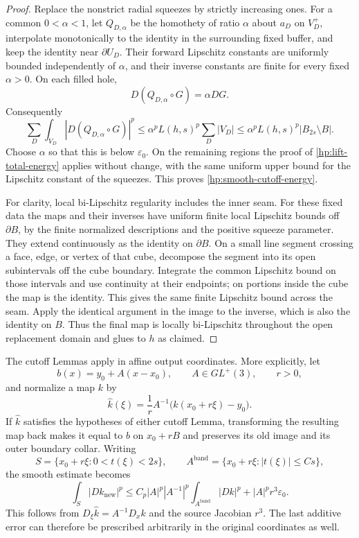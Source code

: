 \begin{proof}
Replace the nonstrict radial squeezes by strictly increasing ones.
For a common $0<\alpha<1$, let $Q_{D,\alpha}$ be the homothety of
ratio $\alpha$ about $a_D$ on $V_D^+$, interpolate monotonically to
the identity in the surrounding fixed buffer, and keep the identity
near $\partial U_D$.  Their forward Lipschitz constants are uniformly
bounded independently of $\alpha$, and their inverse constants are
finite for every fixed $\alpha>0$.  On each filled hole,
\[
 D(Q_{D,\alpha}\circ G)=\alpha DG.
\]
Consequently
\[
 \sum_D\int_{V_D}|D(Q_{D,\alpha}\circ G)|^p
 \leq\alpha^pL(h,s)^p\sum_D|V_D|
 \leq\alpha^pL(h,s)^p|B_{2s}\setminus B|.
\]
Choose $\alpha$ so that this is below $\varepsilon_0$.  On the
remaining regions the proof of
\eqref{hp:lift-total-energy} applies without change, with the same
uniform upper bound for the Lipschitz constant of the squeezes.
This proves \eqref{hp:smooth-cutoff-energy}.

For clarity, local bi-Lipschitz regularity includes the inner seam.
For these fixed data the maps and their inverses have uniform finite
local Lipschitz bounds off $\partial B$, by the finite normalized
descriptions and the positive squeeze parameter.  They extend
continuously as the identity on $\partial B$.  On a small line
segment crossing a face, edge, or vertex of that cube, decompose the
segment into its open subintervals off the cube boundary.  Integrate
the common Lipschitz bound on those intervals and use continuity at
their endpoints; on portions inside the cube the map is the identity.
This gives the same finite Lipschitz bound across the seam.  Apply
the identical argument in the image to the inverse, which is also
the identity on $B$.  Thus the final map is locally bi-Lipschitz
throughout the open replacement domain and glues to $h$ as claimed.
\end{proof}

\begin{remark}\label{hp:cutoff-affine-scaling}
The cutoff Lemmas apply in affine output coordinates.  More
explicitly, let
\[
 b(x)=y_0+A(x-x_0),\qquad A\in GL^+(3),\qquad r>0,
\]
and normalize a map $k$ by
\[
 \widehat k(\xi)
 =\frac1r A^{-1}\bigl(k(x_0+r\xi)-y_0\bigr).
\]
If $\widehat k$ satisfies the hypotheses of either cutoff Lemma,
transforming the resulting map back makes it equal to $b$ on
$x_0+rB$ and preserves its old image and its outer boundary collar.
Writing
\[
 S=\{x_0+r\xi:0<t(\xi)<2s\},\qquad
 A^{\mathrm{band}}=\{x_0+r\xi:|t(\xi)|\leq Cs\},
\]
the smooth estimate becomes
\begin{equation}\label{hp:affine-cutoff-energy}
 \int_S|Dk_{\mathrm{new}}|^p
 \leq C_p|A|^p|A^{-1}|^p
          \int_{A^{\mathrm{band}}}|Dk|^p
       +|A|^pr^3\varepsilon_0.
\end{equation}
This follows from $D_\xi\widehat k=A^{-1}D_xk$ and the source
Jacobian $r^3$.  The last additive error can therefore be prescribed
arbitrarily in the original coordinates as well.
\end{remark}

